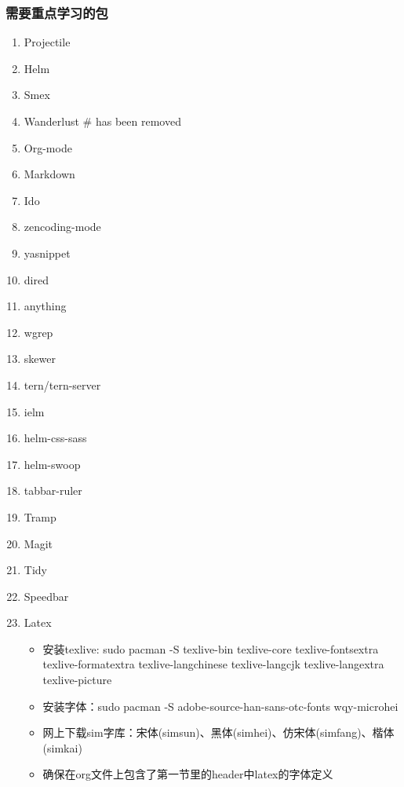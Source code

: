 \documentclass[10pt,a4paper]{article}
\begin{document}
\subsubsection{需要重点学习的包}
\label{sec-4-0-2}
\begin{enumerate}
\item Projectile
\label{sec-4-0-2-1}
\item Helm
\label{sec-4-0-2-2}
\item Smex
\label{sec-4-0-2-3}
\item Wanderlust  \# has been removed
\label{sec-4-0-2-4}
\item Org-mode
\label{sec-4-0-2-5}
\item Markdown
\label{sec-4-0-2-6}
\item Ido
\label{sec-4-0-2-7}
\item zencoding-mode
\label{sec-4-0-2-8}
\item yasnippet
\label{sec-4-0-2-9}
\item dired
\label{sec-4-0-2-10}
\item anything
\label{sec-4-0-2-11}
\item wgrep
\label{sec-4-0-2-12}
\item skewer
\label{sec-4-0-2-13}
\item tern/tern-server
\label{sec-4-0-2-14}
\item ielm
\label{sec-4-0-2-15}
\item helm-css-sass
\label{sec-4-0-2-16}
\item helm-swoop
\label{sec-4-0-2-17}
\item tabbar-ruler
\label{sec-4-0-2-18}
\item Tramp
\label{sec-4-0-2-19}
\item Magit
\label{sec-4-0-2-20}
\item Tidy
\label{sec-4-0-2-21}
\item Speedbar
\label{sec-4-0-2-22}
\item Latex
\label{sec-4-0-2-23}
\begin{itemize}
\item 安装texlive: sudo pacman -S texlive-bin texlive-core texlive-fontsextra texlive-formatextra texlive-langchinese texlive-langcjk texlive-langextra texlive-picture
\item 安装字体：sudo pacman -S adobe-source-han-sans-otc-fonts wqy-microhei
\item 网上下载sim字库：宋体(simsun)、黑体(simhei)、仿宋体(simfang)、楷体(simkai)
\item 确保在org文件上包含了第一节里的header中latex的字体定义
\end{itemize}
\end{enumerate}
\end{document}
